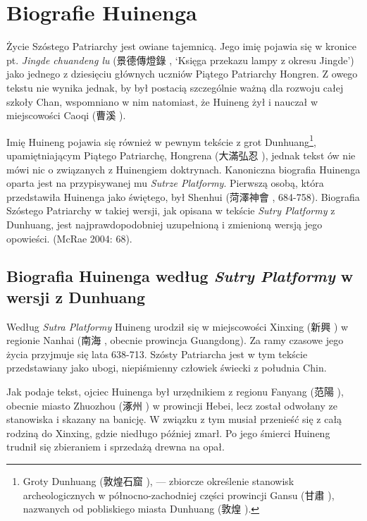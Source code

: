 \chapter{Biografie Huinenga}
Życie Szóstego Patriarchy jest owiane tajemnicą. Jego imię pojawia się w kronice pt. \textit{Jingde chuandeng lu} (景德傳燈錄 , `Księga przekazu lampy z okresu Jingde') jako jednego z dziesięciu głównych uczniów Piątego Patriarchy Hongren.
Z owego tekstu nie wynika jednak, by był postacią szczególnie ważną dla rozwoju całej szkoły Chan, wspomniano w nim natomiast, że Huineng żył i nauczał w miejscowości Caoqi (曹溪 ).

Imię Huineng pojawia się również w pewnym tekście z grot Dunhuang\footnote{Groty Dunhuang (敦煌石窟 ), --- zbiorcze określenie stanowisk archeologicznych w północno-zachodniej części prowincji Gansu (甘肅 ), nazwanych od pobliskiego miasta Dunhuang (敦煌 ).}, upamiętniającym Piątego Patriarchę, Hongrena (大滿弘忍 ), jednak tekst ów nie mówi nic o związanych z Huinengiem doktrynach. Kanoniczna biografia Huinenga oparta jest na przypisywanej mu \textit{Sutrze Platformy}. Pierwszą osobą, która przedstawiła Huinenga jako świętego, był Shenhui (菏澤神會 , 684-758). Biografia Szóstego Patriarchy w takiej wersji, jak opisana w tekście \textit{Sutry Platformy} z Dunhuang, jest najprawdopodobniej uzupełnioną i zmienioną wersją jego opowieści. (McRae 2004: 68).

\section{Biografia Huinenga według \textit{Sutry Platformy} w wersji z Dunhuang}
Według \textit{Sutra Platformy} Huineng urodził się w miejscowości Xinxing (新興 ) w regionie Nanhai (南海 , obecnie prowincja Guangdong). Za ramy czasowe jego życia przyjmuje się lata 638-713. Szósty Patriarcha jest w tym tekście przedstawiany jako ubogi, niepiśmienny człowiek świecki z południa Chin.

Jak podaje tekst, ojciec Huinenga był urzędnikiem z regionu Fanyang (范陽 ), obecnie miasto Zhuozhou (涿州 ) w prowincji Hebei, lecz został odwołany ze stanowiska i skazany na banicję. W związku z tym musiał przenieść się z całą rodziną do Xinxing, gdzie niedługo później zmarł. Po jego śmierci Huineng trudnił się zbieraniem i sprzedażą drewna na opał.

